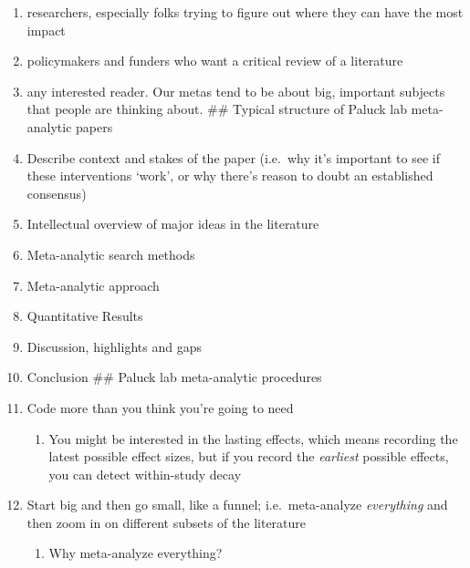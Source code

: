 \documentclass[
  man]{apa6}
\providecommand{\tightlist}{%
  \setlength{\itemsep}{0pt}\setlength{\parskip}{0pt}}
\begin{document}
\begin{enumerate}
\def\labelenumi{\arabic{enumi}.}
\tightlist
\item
  researchers, especially folks trying to figure out where they can have the most impact
\item
  policymakers and funders who want a critical review of a literature
\item
  any interested reader. Our metas tend to be about big, important subjects that people are thinking about.
  \#\# Typical structure of Paluck lab meta-analytic papers
\item
  Describe context and stakes of the paper (i.e.~why it's important to see if these interventions `work', or why there's reason to doubt an established consensus)
\item
  Intellectual overview of major ideas in the literature
\item
  Meta-analytic search methods
\item
  Meta-analytic approach
\item
  Quantitative Results
\item
  Discussion, highlights and gaps
\item
  Conclusion
  \#\# Paluck lab meta-analytic procedures
\item
  Code more than you think you're going to need

  \begin{enumerate}
  \def\labelenumii{\arabic{enumii}.}
  \tightlist
  \item
    You might be interested in the lasting effects, which means recording the latest possible effect sizes, but if you record the \emph{earliest} possible effects, you can detect within-study decay
  \end{enumerate}
\item
  Start big and then go small, like a funnel; i.e.~meta-analyze \emph{everything} and then zoom in on different subsets of the literature

  \begin{enumerate}
  \def\labelenumii{\arabic{enumii}.}
  \setcounter{enumii}{1}
  \tightlist
  \item
    Why meta-analyze everything?


\end{enumerate}
\end{enumerate}
\end{document}
